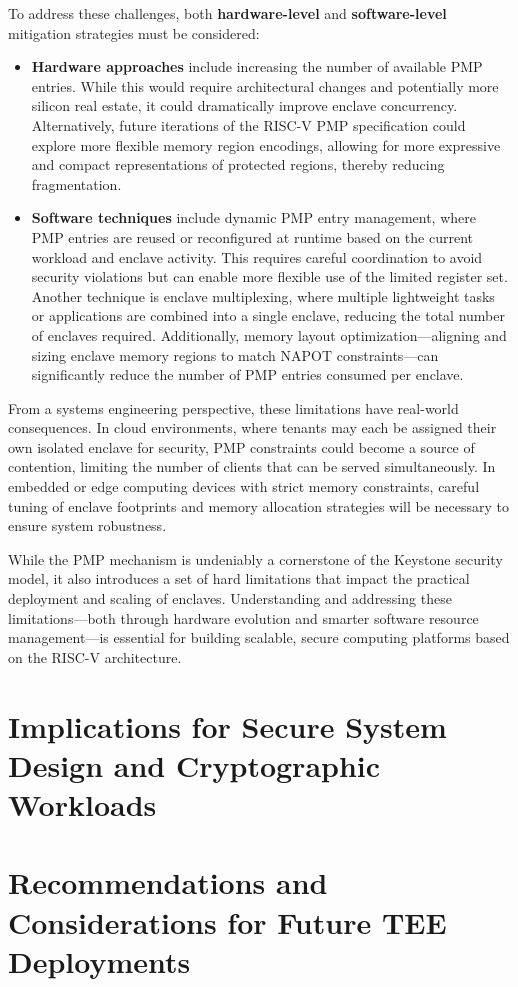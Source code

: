 To address these challenges, both \textbf{hardware-level} and \textbf{software-level} mitigation strategies must be considered:

\begin{itemize}
    \item \textbf{Hardware approaches} include increasing the number of available PMP entries. While this would require architectural changes and potentially more silicon real estate, it could dramatically improve enclave concurrency. Alternatively, future iterations of the RISC-V PMP specification could explore more flexible memory region encodings, allowing for more expressive and compact representations of protected regions, thereby reducing fragmentation.
    \item \textbf{Software techniques} include dynamic PMP entry management, where PMP entries are reused or reconfigured at runtime based on the current workload and enclave activity. This requires careful coordination to avoid security violations but can enable more flexible use of the limited register set. Another technique is enclave multiplexing, where multiple lightweight tasks or applications are combined into a single enclave, reducing the total number of enclaves required. Additionally, memory layout optimization—aligning and sizing enclave memory regions to match NAPOT constraints—can significantly reduce the number of PMP entries consumed per enclave.
\end{itemize}

From a systems engineering perspective, these limitations have real-world consequences. In cloud environments, where tenants may each be assigned their own isolated enclave for security, PMP constraints could become a source of contention, limiting the number of clients that can be served simultaneously. In embedded or edge computing devices with strict memory constraints, careful tuning of enclave footprints and memory allocation strategies will be necessary to ensure system robustness.

While the PMP mechanism is undeniably a cornerstone of the Keystone security model, it also introduces a set of hard limitations that impact the practical deployment and scaling of enclaves. Understanding and addressing these limitations—both through hardware evolution and smarter software resource management—is essential for building scalable, secure computing platforms based on the RISC-V architecture.

\section{Implications for Secure System Design and Cryptographic Workloads}

\section{Recommendations and Considerations for Future TEE Deployments}